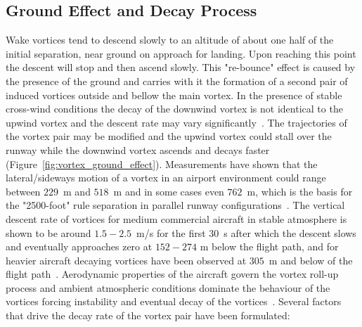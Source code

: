 \subsection{Ground Effect and Decay Process}
Wake vortices tend to descend slowly to an altitude of about one half of the initial separation, near ground on approach for landing.
Upon reaching this point the descent will stop and then ascend slowly. This "re-bounce" effect is caused by the presence of the ground and carries with it the formation of a second pair of induced vortices outside and bellow the main vortex. 
In the presence of stable cross-wind conditions the decay of the downwind vortex is not identical to the upwind vortex and the descent rate may vary significantly~\cite{Hallock2018Apr}. 
The trajectories of the vortex pair may be modified and the upwind vortex could stall over the runway while the downwind vortex ascends and decays faster (Figure~\ref{fig:vortex_ground_effect}).
Measurements have shown that the lateral/sideways motion of a vortex in an airport environment could range between $229$~m and $518$~m and in some cases even $762$~m, which is the basis for the "2500-foot" rule separation in parallel runway configurations~\cite{Hallock2018Apr, hallock2004summary, hallock2003wake}. The vertical descent rate of vortices for medium commercial aircraft in stable atmosphere  is shown to be around $1.5-2.5$~m/s for the first $30$~s after which the descent slows and eventually approaches zero at $152-274$ m below the flight path, and for heavier aircraft decaying vortices have been observed at $305$~m and below of the flight path~\cite{lissaman1973aircraft, Hallock2018Apr}. 
Aerodynamic properties of the aircraft govern the vortex roll-up process and ambient atmospheric conditions dominate the behaviour of the vortices forcing instability and eventual decay of the vortices~\cite{Hallock2018Apr}.
Several factors that drive the decay rate of the vortex pair have been formulated:

